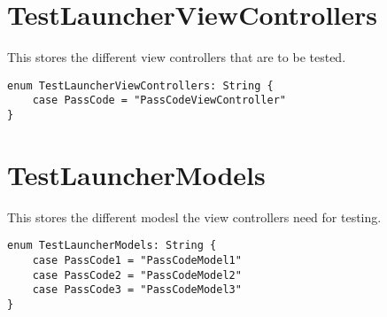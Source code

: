 \documentclass[10pt]{article}
\begin{document}
\section{TestLauncherViewControllers}
This stores the different view controllers that are to be tested.
\begin{verbatim}
enum TestLauncherViewControllers: String {
    case PassCode = "PassCodeViewController"
}
\end{verbatim}

\section{TestLauncherModels}
This stores the different modesl the view controllers need for testing.
\begin{verbatim}
enum TestLauncherModels: String {
    case PassCode1 = "PassCodeModel1"
    case PassCode2 = "PassCodeModel2"
    case PassCode3 = "PassCodeModel3"
}
\end{verbatim}
\end{document}
